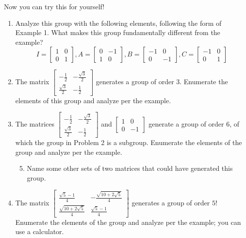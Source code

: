 \documentclass[../gatm.tex]{subfiles}
\begin{document}
\noindent Now you can try this for yourself!
\begin{enumerate}
\item Analyze this group with the following elements, following the form of Example 1. What makes this group fundamentally different from the example?
$$I=\left[\begin{array}{cc} 1 & 0 \\ 0 & 1 \end{array}\right], A=\left[\begin{array}{cc} 0 & -1 \\ 1 & 0 \end{array}\right], B=\left[\begin{array}{cc} -1 & 0 \\ 0 & -1 \end{array}\right], C=\left[\begin{array}{cc} -1 & 0 \\ 0 & 1 \end{array}\right]$$
\item The matrix $\left[\begin{array}{cc} -\frac{1}{2} & -\frac{\sqrt{3}}{2} \\ \frac{\sqrt{3}}{2} & -\frac{1}{2}\end{array}\right]$ generates a group of order $3$. Enumerate the elements of this group and analyze per the example.
\item The matrices $\left[\begin{array}{cc} -\frac{1}{2} & -\frac{\sqrt{3}}{2} \\ \frac{\sqrt{3}}{2} & -\frac{1}{2}\end{array}\right]$ and $\left[\begin{array}{cc} 1 & 0 \\ 0 & -1 \end{array}\right]$ generate a group of order $6$, of which the group in Problem 2 is a subgroup. Enumerate the elements of the group and analyze per the example.
\begin{enumerate}
\setcounter{enumii}{4}
\item Name some other sets of two matrices that could have generated this group.
\end{enumerate}
\item The matrix $\left[\begin{array}{cc} \frac{\sqrt{5}-1}{4} & -\frac{\sqrt{10+2\sqrt{5}}}{4} \\ \frac{\sqrt{10+2\sqrt{5}}}{4} & \frac{\sqrt{5}-1}{4} \end{array}\right]$ generates a group of order $5$! Enumerate the elements of the group and analyze per the example; you can use a calculator.

\end{enumerate}
\end{document}
